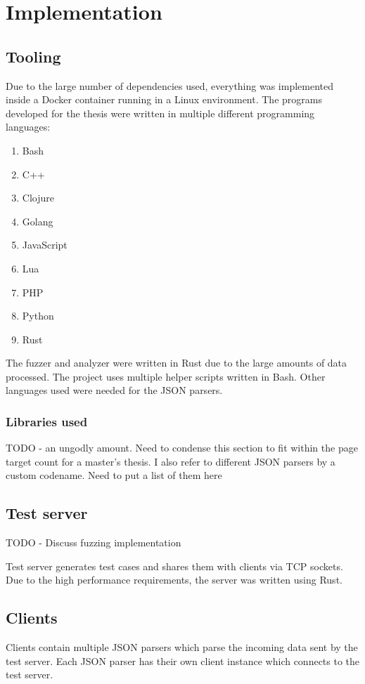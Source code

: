 \documentclass[english, 12pt, a4paper, sci, utf8, a-2b, online]{aaltothesis}
\def\note#1{\begin{flushleft}
	{\color{orange} \raggedright \textsf{#1}}
 \linebreak \noindent
\end{flushleft}}
\begin{document}
\section{Implementation}
\subsection{Tooling}
Due to the large number of dependencies used, everything was implemented inside a Docker container running in a Linux environment. The programs developed for the thesis were written in multiple different programming languages:

\begin{enumerate}
	\item Bash
	\item C++
	\item Clojure
	\item Golang
	\item JavaScript
	\item Lua
	\item PHP
	\item Python
	\item Rust
\end{enumerate}

The fuzzer and analyzer were written in Rust due to the large amounts of data processed. The project uses multiple helper scripts written in Bash. Other languages used were needed for the JSON parsers.


\subsubsection{Libraries used}
\note{TODO - an ungodly amount. Need to condense this section to fit within the page target count for a master's thesis. I also refer to different JSON parsers by a custom codename. Need to put a list of them here}


\subsection{Test server}
\note{TODO - Discuss fuzzing implementation}
Test server generates test cases and shares them with clients via TCP sockets. Due to the high performance requirements, the server was written using Rust.


\subsection{Clients}
Clients contain multiple JSON parsers which parse the incoming data sent by the test server. Each JSON parser has their own client instance which connects to the test server.
\end{document}
